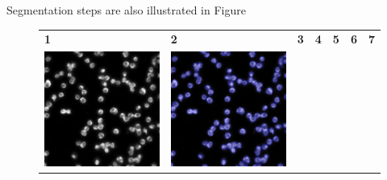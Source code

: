 Segmentation steps are also illustrated in Figure \begin{figure}[H]
    \centering
    \centering
        \begin{tabularx}{\textwidth}{YYYYYYY}
            \textbf{1} &
            \textbf{2} &
            \textbf{3} &
            \textbf{4} &
            \textbf{5} &
            \textbf{6} &
            \textbf{7} \\
            \includegraphics{bilder/ER/segmentation/pp_1.png} & \includegraphics{bilder/ER/segmentation/pp_2.png} &

\end{tabularx}
\end{figure}
